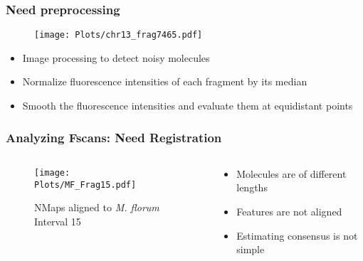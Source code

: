 \documentclass[10pt,dvipsnames,table]{beamer}
\begin{document}
\begin{frame}
\frametitle{Need preprocessing}
\begin{figure}[t]
\texttt{[image: Plots/chr13\_frag7465.pdf]}
\end{figure}
\vspace{-0.5cm}
\begin{itemize}
\item Image processing to detect noisy molecules
\item Normalize fluorescence intensities of each fragment by its median
\item Smooth the fluorescence intensities and evaluate them at equidistant points
\end{itemize}

\end{frame}

\begin{frame}
\frametitle{Analyzing Fscans: Need Registration}
\begin{columns}
\begin{column}{0.5\textwidth}
\begin{figure}[H]
\begin{center}
\texttt{[image: Plots/MF\_Frag15.pdf]}
\end{center}
\caption{NMaps aligned to {\emph{M. florum}} Interval 15}
\end{figure}
\end{column}
\begin{column}{0.5\textwidth}
\begin{itemize}
\item Molecules are of different lengths
\vspace{1cm}
\item Features are not aligned
\vspace{1cm}
\item Estimating consensus is not simple
\end{itemize}
\end{column}
\end{columns}
\end{frame}
\end{document}
